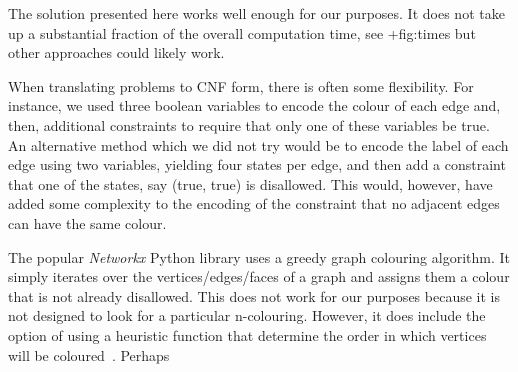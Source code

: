 The solution presented here works well enough for our purposes. It does not take up a substantial fraction of the overall computation time, see +fig:times but other approaches could likely work.

When translating problems to CNF form, there is often some flexibility. For instance, we used three boolean variables to encode the colour of each edge and, then, additional constraints to require that only one of these variables be true. An alternative method which we did not try would be to encode the label of each edge using two variables, yielding four states per edge, and then add a constraint that one of the states, say (true, true) is disallowed. This would, however, have added some complexity to the encoding of the constraint that no adjacent edges can have the same colour.

The popular \emph{Networkx} Python library uses a greedy graph colouring algorithm. It simply iterates over the vertices/edges/faces of a graph and assigns them a colour that is not already disallowed. This does not work for our purposes because it is not designed to look for a particular n-colouring. However, it does include the option of using a heuristic function that determine the order in which vertices will be coloured~\autocite{kosowski2004classical,matulaSmallestlastOrderingClustering1983}. Perhaps
